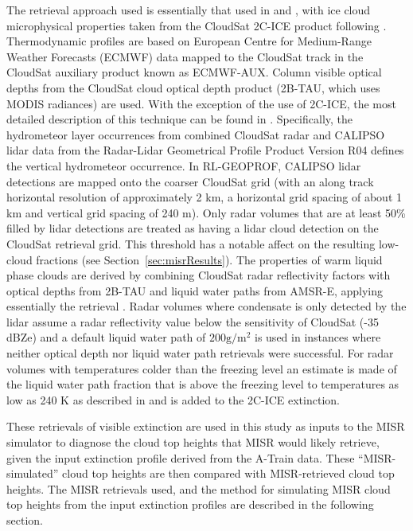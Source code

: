 The retrieval approach used is essentially that used in
\citet{mace_and_wrenn_2013} and \citet{berry_and_mace_2014}, with ice
cloud microphysical properties taken from the CloudSat 2C-ICE product
\citep{deng_et_al_2010, deng_et_al_2013} following
\citet{berry_and_mace_2014}. Thermodynamic profiles are based on
European Centre for Medium-Range Weather Forecasts (ECMWF) data mapped
to the CloudSat track in the CloudSat auxiliary product known as
ECMWF-AUX. Column visible optical depths from the CloudSat cloud optical
depth product (2B-TAU, which uses MODIS radiances) are used. With the
exception of the use of 2C-ICE, the most detailed description of this
technique can be found in \citet{mace_2010}. Specifically, the
hydrometeor layer occurrences from combined CloudSat radar and CALIPSO
lidar data from the Radar-Lidar Geometrical Profile Product
\citep[RL-GEOPROF;][]{mace_et_al_2009, mace_and_zhang_2014} Version R04
defines the vertical hydrometeor occurrence. In RL-GEOPROF, CALIPSO
lidar detections are mapped onto the coarser CloudSat grid (with an
along track horizontal resolution of approximately 2 km, a horizontal
grid spacing of about 1 km and vertical grid spacing of 240 m). Only
radar volumes that are at least 50\% filled by lidar detections are
treated as having a lidar cloud detection on the CloudSat retrieval
grid. This threshold has a notable affect on the resulting low-cloud
fractions (see Section~\ref{sec:misrResults}). The properties of warm
liquid phase clouds are derived by combining CloudSat radar reflectivity
factors with optical depths from 2B-TAU and liquid water paths from
AMSR-E, applying essentially the \citet{dong_and_mace_2003} retrieval
\citep[see][Appendix A]{mace_2010}. Radar volumes where condensate is
only detected by the lidar assume a radar reflectivity value below the
sensitivity of CloudSat (-35 dBZe) and a default liquid water path of
\(200 \textrm{g}/\textrm{m}^2\) is used in instances where neither
optical depth nor liquid water path retrievals were successful. For
radar volumes with temperatures colder than the freezing level an
estimate is made of the liquid water path fraction that is above the
freezing level to temperatures as low as 240 K as described in
\citet{mace_et_al_2006} and is added to the 2C-ICE extinction.

These retrievals of visible extinction are used in this study as inputs
to the MISR simulator to diagnose the cloud top heights that MISR would
likely retrieve, given the input extinction profile derived from the
A-Train data. These ``MISR-simulated'' cloud top heights are then
compared with MISR-retrieved cloud top heights. The MISR retrievals
used, and the method for simulating MISR cloud top heights from the
input extinction profiles are described in the following section.

